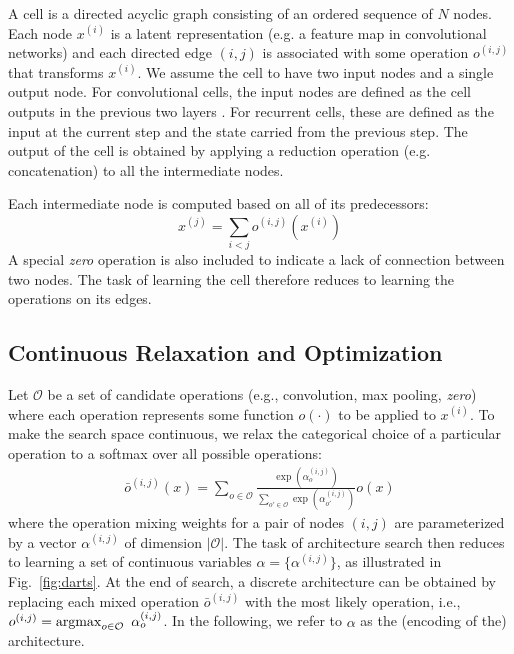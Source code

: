 \documentclass{article}
\begin{document}
A cell is a directed acyclic graph consisting of an ordered sequence of $N$ nodes.
Each node $x^{(i)}$ is a latent representation (e.g. a feature map in convolutional networks) and each directed
edge $(i,j)$ is associated with some operation $o^{(i,j)}$
that transforms $x^{(i)}$.
We assume the cell to have two input nodes and a single output node.
For convolutional cells,
the input nodes are defined as the cell outputs in the previous two layers \citep{zoph2017learning}.
For recurrent cells,
these are defined as the input at the current step and the state carried from the previous step.
The output of the cell is obtained by applying a reduction operation
(e.g. concatenation) to all the intermediate nodes.

Each intermediate node is computed based on all of its predecessors:
\begin{equation}
	x^{(j)} = \sum_{i<j} o^{(i, j)}(x^{(i)})
\end{equation}
A special \emph{zero} operation is also included to indicate a lack of connection
between two nodes.
The task of learning the cell therefore reduces to learning
the operations on its edges.

\subsection{Continuous Relaxation and Optimization}
\label{sec:sec:relaxation-and-optimization}
Let $\mathcal{O}$ be a set of candidate operations (e.g., convolution, max pooling, \emph{zero})
where each operation represents some function $o(\cdot)$ to be applied to $x^{(i)}$.
To make the search space continuous,
we relax the categorical choice of a particular operation to a softmax over all possible operations:
\begin{align}
	\bar{o}^{(i,j)}(x) = \sum_{o \in \mathcal{O}} \frac{\exp(\alpha_o^{(i,j)})}{\sum_{o' \in \mathcal{O}} \exp(\alpha_{o'}^{(i,j)})} o(x)
	\label{eq:soft}
\end{align}
where the operation mixing weights for a pair of nodes $(i,j)$ are parameterized by a vector $\alpha^{(i,j)}$ of dimension $|\mathcal{O}|$.
The task of architecture search then
reduces to learning a set of continuous variables $\alpha = \big\{ \alpha^{(i,j)} \big\}$, as illustrated in Fig.~\ref{fig:darts}.
At the end of search,
a discrete architecture can be obtained by replacing each mixed operation $\bar{o}^{(i,j)}$ with the most likely operation, i.e.,
$
	o^{(i,j)} = 
	\mathrm{argmax}_{o \in \mathcal{O}} \enskip \alpha^{(i,j)}_o
$.
In the following, we refer to $\alpha$ as the (encoding of the) architecture.
\end{document}
